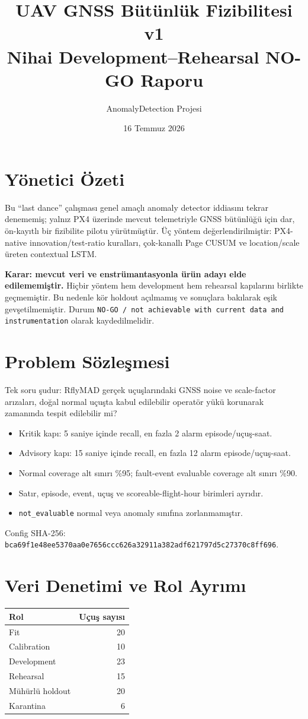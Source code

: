 \documentclass[11pt,a4paper]{article}
\title{UAV GNSS Bütünlük Fizibilitesi v1\\Nihai Development--Rehearsal NO-GO Raporu}
\author{AnomalyDetection Projesi}
\date{16 Temmuz 2026}
\begin{document}
\maketitle

\section{Yönetici Özeti}
Bu ``last dance'' çalışması genel amaçlı anomaly detector iddiasını tekrar
denememiş; yalnız PX4 üzerinde mevcut telemetriyle GNSS bütünlüğü için dar,
ön-kayıtlı bir fizibilite pilotu yürütmüştür. Üç yöntem değerlendirilmiştir:
PX4-native innovation/test-ratio kuralları, çok-kanallı Page CUSUM ve
location/scale üreten contextual LSTM.

\textbf{Karar: mevcut veri ve enstrümantasyonla ürün adayı elde edilememiştir.}
Hiçbir yöntem hem development hem rehearsal kapılarını birlikte geçmemiştir.
Bu nedenle kör holdout açılmamış ve sonuçlara bakılarak eşik gevşetilmemiştir.
Durum \texttt{NO-GO / not achievable with current data and instrumentation}
olarak kaydedilmelidir.

\section{Problem Sözleşmesi}
Tek soru şudur: RflyMAD gerçek uçuşlarındaki GNSS noise ve scale-factor
arızaları, doğal normal uçuşta kabul edilebilir operatör yükü korunarak
zamanında tespit edilebilir mi?
\begin{itemize}
  \item Kritik kapı: 5 saniye içinde recall, en fazla 2 alarm episode/uçuş-saat.
  \item Advisory kapı: 15 saniye içinde recall, en fazla 12 alarm episode/uçuş-saat.
  \item Normal coverage alt sınırı \%95; fault-event evaluable coverage alt sınırı \%90.
  \item Satır, episode, event, uçuş ve scoreable-flight-hour birimleri ayrıdır.
  \item \texttt{not\_evaluable} normal veya anomaly sınıfına zorlanmamıştır.
\end{itemize}
Config SHA-256: \texttt{bca69f1e48ee5370aa0e7656ccc626a32911a382adf621797d5c27370c8ff696}.

\section{Veri Denetimi ve Rol Ayrımı}
\begin{tabular}{lr}
\toprule Rol & Uçuş sayısı \\ \midrule
Fit & 20 \\
Calibration & 10 \\
Development & 23 \\
Rehearsal & 15 \\
Mühürlü holdout & 20 \\
Karantina & 6 \\
\bottomrule
\end{tabular}
\end{document}

